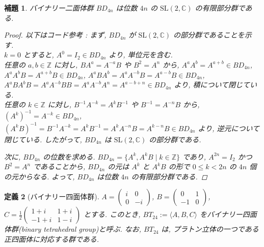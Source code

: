 \documentclass[xelatex,a4paper,ja=standard]{bxjsreport}
\newtheorem{definition}{定義}%
\newtheorem{lemma}[definition]{補題}%
\begin{document}
\begin{lemma}
    バイナリー二面体群 \(BD_{4n}\) は位数 \(4n\) の \(\mathrm{SL}(2, \mathbb{C})\) の有限部分群である.
    \begin{proof}
        以下はコード参考 :
        まず, \(BD_{4n}\) が \(\mathrm{SL}(2, \mathbb{C})\) の部分群であることを示す. \\
        \(k = 0\) とすると, \(A^0 = I_2 \in BD_{4n}\) より, 単位元を含む. \\
        任意の \(a, b \in \mathbb{Z}\) に対し, \(B A^a = A^{-a} B\) や \(B^2 = A^n\) から,
        \(A^a A^b = A^{a+b} \in BD_{4n}\),
        \(A^a A^b B = A^{a+b} B \in BD_{4n}\),
        \(A^a B A^b = A^a A^{-b} B = A^{a-b} B \in BD_{4n}\),
        \(A^a B A^b B = A^a A^{-b} B B = A^a A^{-b} A^n = A^{a-b+n} \in BD_{4n}\) より, 積について閉じている. \\
        任意の \(k \in \mathbb{Z}\) に対し, \(B^{-1} A^{-k} = A^k B^{-1}\) や \(B^{-1} = A^{-n} B\) から,
        \((A^k)^{-1} = A^{-k} \in BD_{4n}\),
        \((A^k B)^{-1} = B^{-1} A^{-k} = A^k B^{-1} = A^k A^{-n} B = A^{k-n} B \in BD_{4n}\) より, 逆元について閉じている.
        したがって, \(BD_{4n}\) は \(\mathrm{SL}(2, \mathbb{C})\) の部分群である.

        次に, \(BD_{4n}\) の位数を求める.
        \(BD_{4n} = \{A^k, A^k B \mid k \in \mathbb{Z}\}\) であり, \(A^{2n} = I_2\) かつ \(B^2 = A^n\) であることから,
        \(BD_{4n}\) の元は \(A^k\) と \(A^k B\) の形で \(0 \leq k < 2n\) の \(4n\) 個の元からなる.
        よって, \(BD_{4n}\) は位数 \(4n\) の有限部分群である.
    \end{proof}
\end{lemma}


\begin{definition}[バイナリー四面体群]
    \(A = \begin{pmatrix} i & 0 \\ 0 & -i \end{pmatrix}\),
    \(B = \begin{pmatrix} 0 & 1 \\ -1 & 0 \end{pmatrix}\),
    \(C = \frac{1}{2} \begin{pmatrix} 1 + i & 1 + i \\ -1 + i & 1 - i \end{pmatrix}\) とする.
    このとき, \(BT_{24} := \langle A, B, C \rangle\) をバイナリー四面体群(binary tetrahedral group)と呼ぶ.
    なお, \(BT_{24}\) は, プラトン立体の一つである正四面体に対応する群である.
\end{definition}
\end{document}
